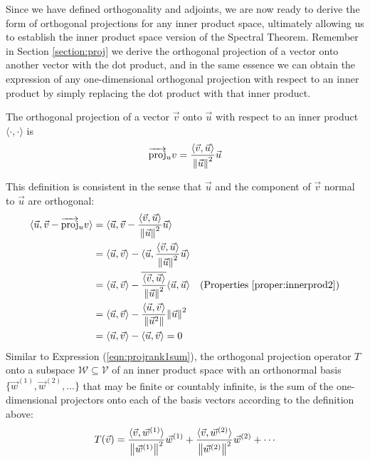 Since we have defined orthogonality and adjoints, we are now ready to derive the form of orthogonal projections for any inner product space, ultimately allowing us to establish the inner product space version of the Spectral Theorem. Remember in Section \ref{section:proj} we derive the orthogonal projection of a vector onto another vector with the dot product, and in the same essence we can obtain the expression of any one-dimensional orthogonal projection with respect to an inner product by simply replacing the dot product with that inner product.
\begin{defn}
\label{defn:orthoprojinner}
The orthogonal projection of a vector $\vec{v}$ onto $\vec{u}$ with respect to an inner product $\langle \cdot, \cdot \rangle$ is
\begin{align}
\overrightarrow{\text{proj}}_u v = \frac{\langle \vec{v}, \vec{u}\rangle}{\norm{\vec{u}}^2} \vec{u}
\end{align}
\end{defn}
This definition is consistent in the sense that $\vec{u}$ and the component of $\vec{v}$ normal to $\vec{u}$ are orthogonal:
\begin{align*}
\langle \vec{u}, \vec{v} - \overrightarrow{\text{proj}}_u v \rangle &= \langle \vec{u}, \vec{v} - \frac{\langle \vec{v}, \vec{u}\rangle}{\norm{\vec{u}}^2} \vec{u} \rangle \\
&= \langle \vec{u}, \vec{v} \rangle - \langle \vec{u}, \frac{\langle \vec{v}, \vec{u}\rangle}{\norm{\vec{u}}^2} \vec{u} \rangle \\
&= \langle \vec{u}, \vec{v} \rangle - \overline{\frac{\langle \vec{v}, \vec{u}\rangle}{\norm{\vec{u}}^2}} \langle \vec{u}, \vec{u} \rangle & \text{(Properties \ref{proper:innerprod2})}\\
&= \langle \vec{u}, \vec{v} \rangle - \frac{\langle \vec{u}, \vec{v}\rangle}{\norm{\vec{u}^2}} {\norm{\vec{u}}^2} \\
&= \langle \vec{u}, \vec{v} \rangle -  \langle \vec{u}, \vec{v} \rangle = 0
\end{align*}
Similar to Expression (\ref{eqn:projrank1sum}), the orthogonal projection operator $T$ onto a subspace $\mathcal{W} \subseteq \mathcal{V}$ of an inner product space with an orthonormal basis $\{\vec{w}^{(1)}, \vec{w}^{(2)}, \ldots\}$ that may be finite or countably infinite, is the sum of the one-dimensional projectors onto each of the basis vectors according to the definition above:
\begin{align}
T(\vec{v}) = \frac{\langle \vec{v}, \vec{w}^{(1)}\rangle}{\norm{\vec{w}^{(1)}}^2} \vec{w}^{(1)} + \frac{\langle \vec{v}, \vec{w}^{(2)}\rangle}{\norm{\vec{w}^{(2)}}^2} \vec{w}^{(2)} + \cdots \label{eqn:orthoprojinner}
\end{align}
